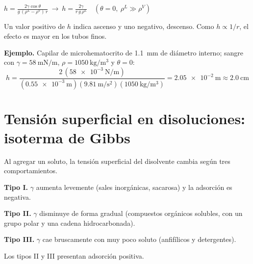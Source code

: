 \documentclass[10pt,letterpaper]{article}
\begin{document}
\begin{clave}
$\displaystyle h=\frac{2\gamma\cos\theta}{g\,(\rho^L-\rho^V)\,r}\ \longrightarrow\ h=\frac{2\gamma}{r\,g\,\rho^L}\quad(\theta=0,\ \rho^L\gg\rho^V)$
\end{clave}
Un valor positivo de $h$ indica ascenso y uno negativo, descenso. Como $h\propto1/r$, el efecto es mayor en los tubos finos.
\begin{apoyo}\small\textbf{Ejemplo.} Capilar de microhematocrito de \SI{1,1}{\milli\meter} de diámetro interno; sangre con $\gamma=\SI{58}{\milli\newton\per\meter}$, $\rho=\SI{1050}{\kilo\gram\per\meter\cubed}$ y $\theta=0$:
\[h=\frac{2\,(\SI{58e-3}{\newton\per\meter})}{(\SI{0,55e-3}{\meter})(\SI{9,81}{\meter\per\second\squared})(\SI{1050}{\kilo\gram\per\meter\cubed})}=\SI{2,05e-2}{\meter}\approx\SI{2,0}{\centi\meter}\]
\end{apoyo}

\section{Tensión superficial en disoluciones: isoterma de Gibbs}
\begin{minipage}[t]{0.52\linewidth}\vspace{0pt}
\small
Al agregar un soluto, la tensión superficial del disolvente cambia según tres comportamientos.

\smallskip
\textbf{Tipo I.} $\gamma$ aumenta levemente (sales inorgánicas, sacarosa) y la adsorción es negativa.

\smallskip
\textbf{Tipo II.} $\gamma$ disminuye de forma gradual (compuestos orgánicos solubles, con un grupo polar y una cadena hidrocarbonada).

\smallskip
\textbf{Tipo III.} $\gamma$ cae bruscamente con muy poco soluto (anfifílicos y detergentes).

\smallskip
Los tipos II y III presentan adsorción positiva.
\end{minipage}\hfill
\begin{minipage}[t]{0.44\linewidth}\vspace{0pt}
\centering
{}
\end{minipage}
\end{document}
